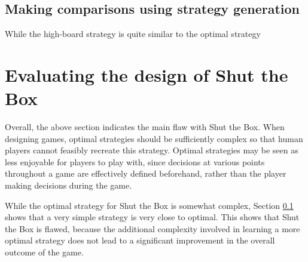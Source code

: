 \subsection{Making comparisons using strategy generation}
\label{cs1:compare-strats}

While the high-board strategy is quite similar to the optimal strategy

\section{Evaluating the design of Shut the Box}

Overall, the above section indicates the main flaw with Shut the Box. When designing games, optimal strategies should be sufficiently complex so that human players cannot feasibly recreate this strategy. Optimal strategies may be seen as less enjoyable for players to play with, since decisions at various points throughout a game are effectively defined beforehand, rather than the player making decisions during the game.

While the optimal strategy for Shut the Box is somewhat complex, Section \ref{cs1:compare-strats} shows that a very simple strategy is very close to optimal. This shows that Shut the Box is flawed, because the additional complexity involved in learning a more optimal strategy does not lead to a significant improvement in the overall outcome of the game.